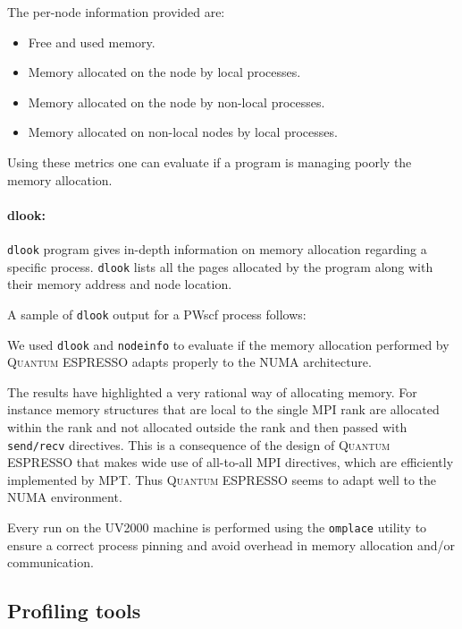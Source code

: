 \documentclass[a4paper,12pt]{article}
\newcommand\QE{\textsc{Quantum} ESPRESSO }
\begin{document}
The per-node information provided are:
\begin{itemize}
	\item Free and used memory.
	\item Memory allocated on the node by local processes.
	\item Memory allocated on the node by non-local processes.
	\item Memory allocated on non-local nodes by local processes.
\end{itemize}

Using these metrics one can evaluate if a program is managing poorly the memory allocation.

\paragraph{dlook:} \texttt{dlook} program gives in-depth information on memory allocation regarding a specific process.
\texttt{dlook} lists all the pages allocated by the program along with their memory address and node location.

A sample of \texttt{dlook} output for a PWscf process follows:



We used \texttt{dlook} and \texttt{nodeinfo} to evaluate if the memory allocation performed by \QE adapts properly to the NUMA architecture.

The results have highlighted a very rational way of allocating memory.
For instance memory structures that are local to the single MPI rank are allocated within the rank and not allocated outside the rank and then passed with \texttt{send/recv} directives.
This is a consequence of the design of \QE that makes wide use of all-to-all MPI directives, which are efficiently implemented by MPT.
Thus \QE seems to adapt well to the NUMA environment.

\begin{framed}
	Every run on the UV2000 machine is performed using the \texttt{omplace} utility to ensure a correct process pinning and avoid overhead in memory allocation and/or communication.
\end{framed}



\subsection{Profiling tools}\label{sec:profTools}
\end{document}
